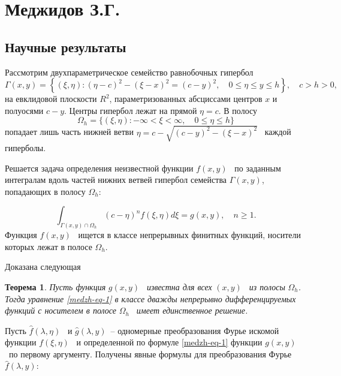 \chapter{Меджидов З.Г.}

\section{Научные результаты}

Рассмотрим двухпараметрическое семейство равнобочных гипербол 
\begin{equation*}
\Gamma \left(x,y\right)=\left\{\left(\xi ,\eta \right):\left(\eta -c\right)^2-(\xi -x)^2=(c-y)^2,\quad 0{\leq}\eta
{\leq}y{\leq}h\right\},\quad c>h>0,
\end{equation*}
на евклидовой плоскости  $R^2$, параметризованных абсциссами центров  $x$ и полуосями  $c-y$. Центры гипербол лежат на
прямой  $\eta =c$. В полосу 
\begin{equation*}
\Omega _h=\{\left(\xi ,\eta \right):-{\infty}<\xi <{\infty},\quad 0{\leq}\eta {\leq}h\}
\end{equation*}
попадает лишь часть нижней ветви  $\eta =c-\sqrt{\left(c-y\right)^2-\left(\xi -x\right)^2}$ \ каждой гиперболы.

Решается задача определения неизвестной функции  $f(x,y)$ \ по заданным интегралам вдоль частей нижних ветвей гипербол
семейства  $\Gamma \left(x,y\right)$, попадающих в полосу  $\Omega _h$:

\begin{equation}\label{medzh-eq-1}
\int _{\Gamma \left(x,y\right){\cap}\Omega _h}^{}\left(c-\eta \right)^nf\left(\xi ,\eta \right)\mathit{d\xi
}=g\left(x,y\right),\quad n{\geq}1.
\end{equation}
Функция  $f(x,y)$ \ ищется в классе непрерывных финитных функций, носители которых лежат в полосе  $\Omega _h$. 

Доказана следующая 

\textbf{Теорема 1}. \textit{Пусть функция } $g\left(x,y\right)$ \textit{\ известна для всех } $\left(x,y\right)$
\textit{\ из полосы } $\Omega _h$\textit{. Тогда уравнение \eqref{medzh-eq-1} в классе дважды непрерывно дифференцируемых функций с
	носителем в полосе } $\Omega _h$ \textit{\ имеет единственное решение.}

Пусть  $\widehat  f(\lambda ,\eta )$ \ и  $\widehat  g\left(\lambda ,y\right)$\ – одномерные преобразования Фурье
искомой функции  $f(\xi ,\eta )$ \ и определенной по формуле \eqref{medzh-eq-1} функции  $g(x,y)$ \ по первому аргументу. Получены
явные формулы для преобразования Фурье  $\widehat  f\left(\lambda ,y\right)$: 


